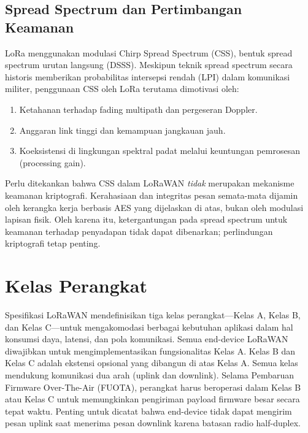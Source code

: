 \subsection{Spread Spectrum dan Pertimbangan Keamanan}
LoRa menggunakan modulasi Chirp Spread Spectrum (CSS), bentuk spread spectrum urutan langsung (DSSS). Meskipun teknik spread spectrum secara historis memberikan probabilitas intersepsi rendah (LPI) dalam komunikasi militer, penggunaan CSS oleh LoRa terutama dimotivasi oleh:
\begin{enumerate}
    \item Ketahanan terhadap fading multipath dan pergeseran Doppler.
    \item Anggaran link tinggi dan kemampuan jangkauan jauh.
    \item Koeksistensi di lingkungan spektral padat melalui keuntungan pemrosesan (processing gain).
\end{enumerate}
Perlu ditekankan bahwa CSS dalam LoRaWAN \emph{tidak} merupakan mekanisme keamanan kriptografi. Kerahasiaan dan integritas pesan semata-mata dijamin oleh kerangka kerja berbasis AES yang dijelaskan di atas, bukan oleh modulasi lapisan fisik. Oleh karena itu, ketergantungan pada spread spectrum untuk keamanan terhadap penyadapan tidak dapat dibenarkan; perlindungan kriptografi tetap penting.
\section{Kelas Perangkat}
Spesifikasi LoRaWAN mendefinisikan tiga kelas perangkat—Kelas A, Kelas B, dan Kelas C—untuk mengakomodasi berbagai kebutuhan aplikasi dalam hal konsumsi daya, latensi, dan pola komunikasi. Semua end-device LoRaWAN diwajibkan untuk mengimplementasikan fungsionalitas Kelas A. Kelas B dan Kelas C adalah ekstensi opsional yang dibangun di atas Kelas A. Semua kelas mendukung komunikasi dua arah (uplink dan downlink). Selama Pembaruan Firmware Over-The-Air (FUOTA), perangkat harus beroperasi dalam Kelas B atau Kelas C untuk memungkinkan pengiriman payload firmware besar secara tepat waktu.
Penting untuk dicatat bahwa end-device tidak dapat mengirim pesan uplink saat menerima pesan downlink karena batasan radio half-duplex.
